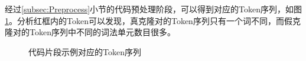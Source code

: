 经过\ref{subsec:Preprocess}小节的代码预处理阶段，可以得到对应的Token序列，如图\ref{fig:token}。分析红框内的Token可以发现，真克隆对的Token序列只有一个词不同，而假克隆对的Token序列中不同的词法单元数目很多。

\begin{figure}[htp] 
  \centering  %
  \caption{代码片段示例对应的Token序列}    %
  \label{fig:token}    %
\end{figure}
    
        

    
